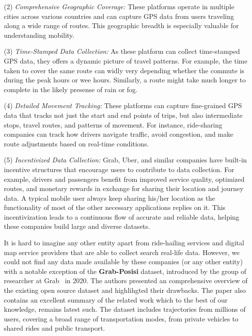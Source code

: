 \documentclass[sigplan,screen]{acmart}
\begin{document}
(2) \emph{Comprehensive Geographic Coverage:}
These platforms operate in multiple cities across various countries and 
can capture GPS data from users traveling along a wide range of routes.
This geographic breadth is especially valuable for understanding 
mobility.

(3) \emph{Time-Stamped Data Collection:}
As these platform can collect time-stamped GPS data,
they offers a dynamic picture of travel patterns.
For example, the time taken to cover the same route
can widly very depending whether the commute is during
the peak hours or wee hours.
Similarly, a route might take much longer to complete
in the likely presense of rain or fog.

(4) \emph{Detailed Movement Tracking:}
These platforms can capture fine-grained GPS data that tracks not just the start and end points of trips, but also intermediate stops, travel routes, and patterns of movement. 
For instance, ride-sharing companies can track how drivers navigate traffic, avoid congestion, and make route adjustments based on real-time conditions. %

(5) \emph{Incentivized Data Collection:}
 Grab, Uber, and similar companies have built-in incentive structures that encourage users to contribute to data collection. 
For example, drivers and passengers benefit from improved service quality, optimized routes, and monetary rewards in exchange for sharing their location and journey data. 
A typical mobile user always keep sharing his/her location
as the functionality of most of the other necessary applications
replies on it.
This incentivization leads to a continuous flow of accurate and reliable data, helping these companies build large and diverse datasets. 

It is hard to imagine any other entity apart from 
ride-hailing services and digital map service providers
that are able to collect search real-life data.
However, we could not find any data made available by these companies
(or any other entity) with a notable exception 
of the \textbf{Grab-Posisi} dataset, introduced by the group of researcher
at Grab~\cite{DBLP:conf/gis/XuYDHKFWZ20} in 2020.
The authors presented an comprehensive overview of the 
existing open source dataset and highlihgted  their
drawbacks.
The paper also contains an excellent summary of 
the related work which to the best of our knowledge,
remains latest such.
The dataset includes trajectories from millions of users, covering a broad range of transportation modes, from private vehicles to shared rides and public transport.
\end{document}
